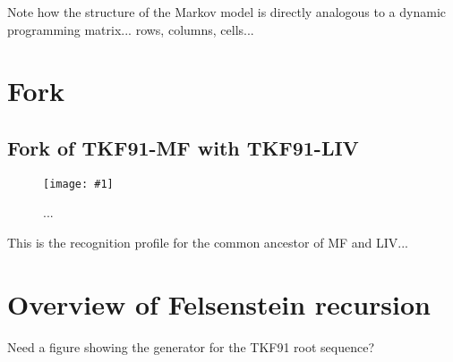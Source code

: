 \documentclass{article}
\newcommand{\figlabel}[1]{\label{Figures.#1}}
\newcommand{\easyfig}[3]{
\begin{figure}
\texttt{[image: \#1]}
\caption{ \figlabel{#2} #3}
\end{figure}}
\newcommand{\pdffig}[2]{\easyfig{#1.pdf}{#1}{#2}}
\newcommand{\pngfig}[2]{\easyfig{#1.png}{#1}{#2}}
\begin{document}
Note how the structure of the Markov model is directly analogous to a dynamic programming matrix...
rows, columns, cells...

\section{Fork}

\subsection{Fork of TKF91-MF with TKF91-LIV}

\pdffig{fork-tkf91liv-tkf91mf}{...}

This is the recognition profile for the common ancestor of MF and LIV...

\section{Overview of Felsenstein recursion}

Need a figure showing the generator for the TKF91 root sequence?


\end{document}
